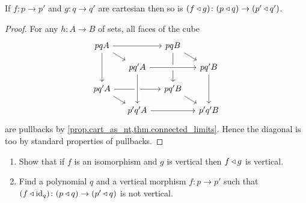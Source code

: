 \documentclass[Book-Poly]{subfiles}
\begin{document}


\begin{proposition}\label{prop.comp_pres_cart}
If $f\colon p\to p'$ and $g\colon q\to q'$ are cartesian then so is $(f\mathbin{\triangleleft} g)\colon(p\mathbin{\triangleleft} q)\to (p'\mathbin{\triangleleft} q')$.
\end{proposition}
\begin{proof}
For any $h\colon A\to B$ of sets, all faces of the cube
\[
\begin{tikzcd}[sep=small]
  pqA\ar[rr]\ar[dd]\ar[dr]&&
  pqB\ar[dd]\ar[dr]\\&
  pq'A\ar[rr, crossing over]&&
  pq'B\ar[dd]\\
  pq'A\ar[rr]\ar[dr]&&
  pq'B\ar[dr]\\&
  p'q'A\ar[from=uu, crossing over]\ar[rr]&&
  p'q'B
\end{tikzcd}
\]
are pullbacks by \cref{prop.cart_as_nt,thm.connected_limits}. Hence the diagonal is too by standard properties of pullbacks.
\end{proof}

\begin{exercise}
\begin{enumerate}
	\item Show that if $f$ is an isomorphism and $g$ is vertical then $f\mathbin{\triangleleft} g$ is vertical.
	\item Find a polynomial $q$ and a vertical morphism $f\colon p\to p'$ such that $(f\mathbin{\triangleleft}\mathrm{id}_q)\colon (p\mathbin{\triangleleft} q)\to (p'\mathbin{\triangleleft} q)$ is not vertical.
\qedhere
\end{enumerate}
\end{exercise}
\end{document}
